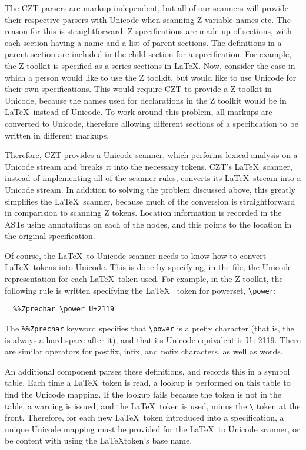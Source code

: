 \documentclass{llncs}
\begin{document}
The CZT parsers are markup independent, but all of our scanners will
provide their respective parsers with Unicode when scanning Z variable
names etc. The reason for this is straightforward: Z specifications
are made up of sections, with each section having a name and a list of
parent sections. The definitions in a parent section are included in
the child section for a specification. For example, the Z toolkit is
specified as a series sections in \LaTeX. Now, consider the case in
which a person would like to use the Z toolkit, but would like to use
Unicode for their own specifications. This would require CZT to
provide a Z toolkit in Unicode, because the names used for
declarations in the Z toolkit would be in \LaTeX~instead of
Unicode. To work around this problem, all markups are converted to
Unicode, therefore allowing different sections of a specification to
be written in different markups.

Therefore, CZT provides a Unicode scanner, which performs lexical
analysis on a Unicode stream and breaks it into the necessary
tokens. CZT's \LaTeX~scanner, instead of implementing all of the
scanner rules, converts its \LaTeX~stream into a Unicode stream. In
addition to solving the problem discussed above, this greatly
simplifies the \LaTeX~scanner, because much of the conversion is
straightforward in comparision to scanning Z tokens. Location
information is recorded in the ASTs using annotations on each of the
nodes, and this points to the location in the original specification.

Of course, the \LaTeX~to Unicode scanner needs to know how to convert
\LaTeX~tokens into Unicode. This is done by specifying, in the file,
the Unicode representation for each \LaTeX~token used. For example, in
the Z toolkit, the following rule is written specifying the \LaTeX~
token for powerset, \verb+\power+:
\begin{verbatim}
  %%Zprechar \power U+2119
\end{verbatim}

The {\tt \%\%Zprechar} keyword specifies that \verb+\power+ is a
prefix character (that is, the is always a hard space after it), and
that its Unicode equivalent is U+2119. There are similar operators for
postfix, infix, and nofix characters, as well as words.

An additional component parses these definitions, and records this in
a symbol table. Each time a \LaTeX~token is read, a lookup is
performed on this table to find the Unicode mapping. If the lookup
fails because the token is not in the table, a warning is issued, and
the \LaTeX~token is used, minus the \verb+\+ token at the
front. Therefore, for each new \LaTeX~token introduced into a
specification, a unique Unicode mapping must be provided for the
\LaTeX~to Unicode scanner, or be content with using the \LaTeX token's
base name.
\end{document}
